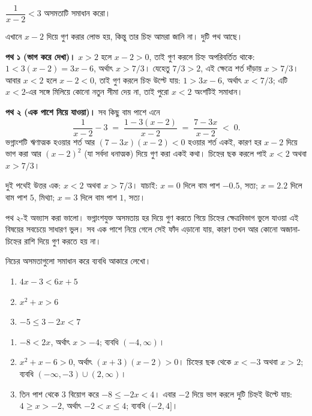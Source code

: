 \documentclass[11pt]{article}
\begin{document}
\begin{example}
$\dfrac{1}{x-2} < 3$ অসমতাটি সমাধান করো।
\end{example}

\begin{solbox}
এখানে $x - 2$ দিয়ে গুণ করার লোভ হয়, কিন্তু তার চিহ্ন আমরা জানি না। দুটি পথ আছে।

\textbf{পথ ১ (ভাগ করে দেখা)।} $x > 2$ হলে $x - 2 > 0$, তাই গুণ করলে চিহ্ন
অপরিবর্তিত থাকে: $1 < 3(x-2) = 3x - 6$, অর্থাৎ $x > 7/3$। যেহেতু $7/3 > 2$,
এই ক্ষেত্রে শর্ত দাঁড়ায় $x > 7/3$। আবার $x < 2$ হলে $x - 2 < 0$, তাই গুণ করলে
চিহ্ন উল্টে যায়: $1 > 3x - 6$, অর্থাৎ $x < 7/3$; এটি $x < 2$-এর সঙ্গে মিলিয়ে
কোনো নতুন সীমা দেয় না, তাই পুরো $x < 2$ অংশটিই সমাধান।

\textbf{পথ ২ (এক পাশে নিয়ে যাওয়া)।} সব কিছু বাম পাশে এনে
\[
  \frac{1}{x-2} - 3 \;=\; \frac{1 - 3(x-2)}{x-2} \;=\; \frac{7 - 3x}{x-2} \;<\; 0 .
\]
ভগ্নাংশটি ঋণাত্মক হওয়ার শর্ত আর $(7-3x)(x-2) < 0$ হওয়ার শর্ত একই, কারণ হর
$x-2$ দিয়ে ভাগ করা আর $(x-2)^2$ (যা সর্বদা ধনাত্মক) দিয়ে গুণ করা একই কথা।
চিহ্নের ছক করলে পাই $x < 2$ অথবা $x > 7/3$।

দুই পথেই উত্তর এক: $x < 2$ অথবা $x > 7/3$। যাচাই: $x = 0$ দিলে বাম পাশ $-0.5$,
সত্য; $x = 2.2$ দিলে বাম পাশ $5$, মিথ্যা; $x = 3$ দিলে বাম পাশ $1$, সত্য।
\end{solbox}

\begin{remark}
পথ ২-ই অভ্যাস করা ভালো। ভগ্নাংশযুক্ত অসমতায় হর দিয়ে গুণ করতে গিয়ে চিহ্নের
ক্ষেত্রবিভাগ ভুলে যাওয়া এই বিষয়ের সবচেয়ে সাধারণ ভুল। সব এক পাশে নিয়ে গেলে
সেই ফাঁদ এড়ানো যায়, কারণ তখন আর কোনো অজানা-চিহ্নের রাশি দিয়ে গুণ করতে হয় না।
\end{remark}

 নিচের অসমতাগুলো সমাধান করে ব্যবধি আকারে লেখো।
\begin{enumerate}
  \item $4x - 3 < 6x + 5$
  \item $x^2 + x > 6$
  \item $-5 \leq 3 - 2x < 7$
\end{enumerate}

\begin{sol}
\begin{enumerate}
  \item $-8 < 2x$, অর্থাৎ $x > -4$; ব্যবধি $(-4, \infty)$।
  \item $x^2 + x - 6 > 0$, অর্থাৎ $(x+3)(x-2) > 0$। চিহ্নের ছক থেকে $x < -3$
        অথবা $x > 2$; ব্যবধি $(-\infty,-3) \cup (2,\infty)$।
  \item তিন পাশ থেকে $3$ বিয়োগ করে $-8 \leq -2x < 4$। এবার $-2$ দিয়ে ভাগ করলে
        দুটি চিহ্নই উল্টে যায়: $4 \geq x > -2$, অর্থাৎ $-2 < x \leq 4$;
        ব্যবধি $(-2, 4]$।
\end{enumerate}
\end{sol}
\end{document}
